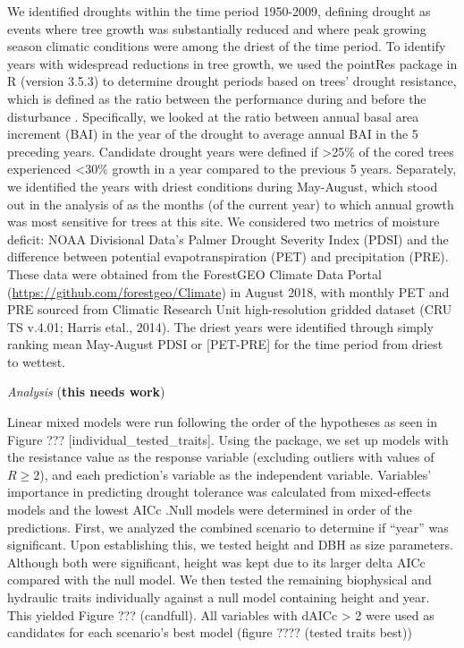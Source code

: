 \documentclass[]{article}
\begin{document}
We identified droughts within the time period 1950-2009, defining
drought \citep{slette_how_2019} as events where tree growth was
substantially reduced and where peak growing season climatic conditions
were among the driest of the time period. To identify years with
widespread reductions in tree growth, we used the pointRes package
\citep{R-pointRes} in R (version 3.5.3) to determine drought periods
based on trees' drought resistance, which is defined as the ratio
between the performance during and before the disturbance
\citep{lloret_components_2011}. Specifically, we looked at the ratio
between annual basal area increment (BAI) in the year of the drought to
average annual BAI in the 5 preceding years. Candidate drought years
were defined if \textgreater{}25\% of the cored trees experienced
\textless{}30\% growth in a year compared to the previous 5 years.
Separately, we identified the years with driest conditions during
May-August, which stood out in the analysis of
\citep{helcoski_growing_2019} as the months (of the current year) to
which annual growth was most sensitive for trees at this site. We
considered two metrics of moisture deficit: NOAA Divisional Data's
Palmer Drought Severity Index (PDSI) and the difference between
potential evapotranspiration (PET) and precipitation (PRE). These data
were obtained from the ForestGEO Climate Data Portal
(\url{https://github.com/forestgeo/Climate}) in August 2018, with
monthly PET and PRE sourced from Climatic Research Unit high-resolution
gridded dataset (CRU TS v.4.01; Harris etal., 2014). The driest years
were identified through simply ranking mean May-August PDSI or
{[}PET-PRE{]} for the time period from driest to wettest.

\emph{Analysis} (\textbf{this needs work})

Linear mixed models were run following the order of the hypotheses as
seen in Figure ??? {[}individual\_tested\_traits{]}. Using the
\citep{R-pointRes} package, we set up models with the resistance value
as the response variable (excluding outliers with values of \(R\ge 2\)),
and each prediction's variable as the independent variable. Variables'
importance in predicting drought tolerance was calculated from
mixed-effects models and the lowest AICc
\citep[\citet{R-AICcmodavg}]{R-lme4}.Null models were determined in
order of the predictions. First, we analyzed the combined scenario to
determine if ``year'' was significant. Upon establishing this, we tested
height and DBH as size parameters. Although both were significant,
height was kept due to its larger delta AICc compared with the null
model. We then tested the remaining biophysical and hydraulic traits
individually against a null model containing height and year. This
yielded Figure ??? (candfull). All variables with dAICc \textgreater{} 2
were used as candidates for each scenario's best model (figure ????
(tested traits best))
\end{document}
